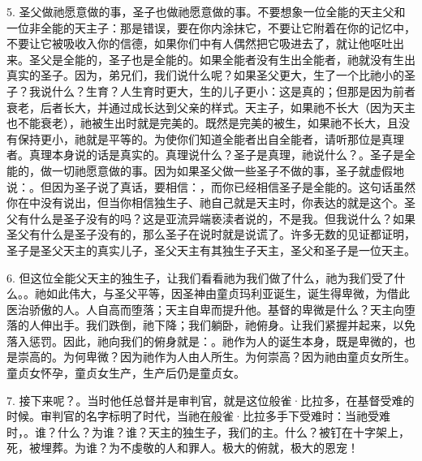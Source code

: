 5. 圣父做祂愿意做的事，圣子也做祂愿意做的事。不要想象一位全能的天主父和一位非全能的天主子：那是错误，要在你内涂抹它，不要让它附着在你的记忆中，不要让它被吸收入你的信德，如果你们中有人偶然把它吸进去了，就让他呕吐出来。圣父是全能的，圣子也是全能的。如果全能者没有生出全能者，祂就没有生出真实的圣子。因为，弟兄们，我们说什么呢？如果圣父更大，生了一个比祂小的圣子？我说什么？生育？人生育时更大，生的儿子更小：这是真的；但那是因为前者衰老，后者长大，并通过成长达到父亲的样式。天主子，如果祂不长大（因为天主也不能衰老），祂被生出时就是完美的。既然是完美的被生，如果祂不长大，且没有保持更小，祂就是平等的。为使你们知道全能者出自全能者，请听那位是真理者。真理本身说的话是真实的。真理说什么？圣子是真理，祂说什么？。圣子是全能的，做一切祂愿意做的事。因为如果圣父做一些圣子不做的事，圣子就虚假地说：。但因为圣子说了真话，要相信：，而你已经相信圣子是全能的。这句话虽然你在中没有说出，但当你相信独生子、祂自己就是天主时，你表达的就是这个。圣父有什么是圣子没有的吗？这是亚流异端亵渎者说的，不是我。但我说什么？如果圣父有什么是圣子没有的，那么圣子在说时就是说谎了。许多无数的见证都证明，圣子是圣父天主的真实儿子，圣父天主有其独生子天主，圣父和圣子是一位天主。\par

6. 但这位全能父天主的独生子，让我们看看祂为我们做了什么，祂为我们受了什么。。祂如此伟大，与圣父平等，因圣神由童贞玛利亚诞生，诞生得卑微，为借此医治骄傲的人。人自高而堕落；天主自卑而提升他。基督的卑微是什么？天主向堕落的人伸出手。我们跌倒，祂下降；我们躺卧，祂俯身。让我们紧握并起来，以免落入惩罚。因此，祂向我们的俯身就是：。祂作为人的诞生本身，既是卑微的，也是崇高的。为何卑微？因为祂作为人由人所生。为何崇高？因为祂由童贞女所生。童贞女怀孕，童贞女生产，生产后仍是童贞女。\par

7. 接下来呢？。当时他任总督并是审判官，就是这位般雀·比拉多，在基督受难的时候。审判官的名字标明了时代，当祂在般雀·比拉多手下受难时：当祂受难时，。谁？什么？为谁？谁？天主的独生子，我们的主。什么？被钉在十字架上，死，被埋葬。为谁？为不虔敬的人和罪人。极大的俯就，极大的恩宠！\par

